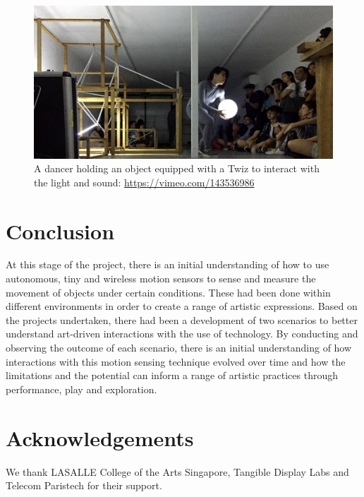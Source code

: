 \documentclass{sigchi}
\begin{document}
\begin{figure}[H]
\centering
\includegraphics[width=\columnwidth]{pics/performance}
\caption{A dancer holding an object equipped with a Twiz to
interact with the light and sound: {\url{https://vimeo.com/143536986}}}
\label{fig:performance}
\end{figure}

\section{Conclusion}

At this stage of the project, there is an initial
understanding of how to use autonomous, tiny and
wireless motion sensors to sense and measure the
movement of objects under certain conditions. These
had been done within different environments in order to
create a range of artistic expressions. Based on the
projects undertaken, there had been a development of
two scenarios to better understand art-driven
interactions with the use of technology.
By conducting and observing the outcome of each
scenario, there is an initial understanding of how
interactions with this motion sensing technique evolved
over time and how the limitations and the potential can
inform a range of artistic practices through
performance, play and exploration.

\section{Acknowledgements}

We thank LASALLE College of the Arts Singapore, Tangible
Display Labs and Telecom Paristech for their support.

\balance



\end{document}
